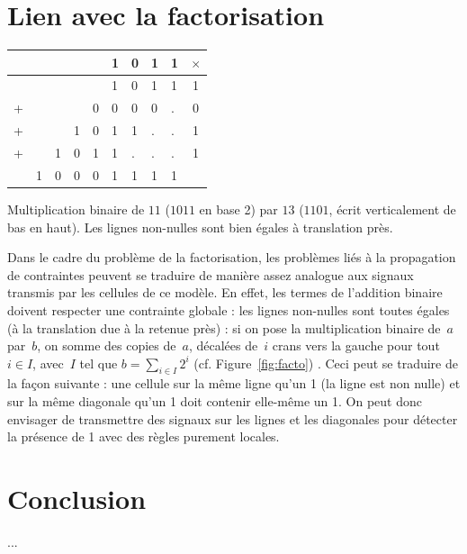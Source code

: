 \documentclass[11pt, openany, a4paper]{article}
\begin{document}

\section{Lien avec la factorisation}

\begin{floatingfigure}[r]{.5\textwidth}
\centering
\begin{tabular}{lllllllll|c}
&&&&&1&0&1&1&$\times$\\
\hline
&&&&&1&0&1&1&1\\
+&&&&0&0&0&0&.&0 \\
+&&&1&0&1&1&.&.&1\\
+&&1&0&1&1&.&.&.&1\\
\hline
&1&0&0&0&1&1&1&1&\\
\end{tabular}
\caption{Multiplication binaire de $11$ ($1011$ en base 2) par $13$ ($1101$, écrit verticalement de bas en haut). Les lignes non-nulles sont bien égales à translation près.}
\label{fig:facto}
\end{floatingfigure}
Dans le cadre du problème de la factorisation, les problèmes liés à la propagation de con\-train\-tes peuvent se traduire de manière assez analogue aux signaux transmis par les cellules de ce modèle. En effet, les termes de l'addition binaire doivent respecter une contrainte globale : les lignes non-nulles sont toutes égales (à la translation due à la retenue près) : si on pose la multiplication binaire de~$a$ par~$b$, on somme des copies de~$a$, décalées de~$i$ crans vers la gauche pour tout $i\in I$, avec~$I$ tel que $b = \sum_{i\in I}2^i$ (cf. Figure~\ref{fig:facto}) . Ceci peut se traduire de la façon suivante : une cellule sur la même ligne qu'un 1 (la ligne est non nulle) et sur la même diagonale qu'un 1 doit contenir elle-même un 1. On peut donc envisager de transmettre des signaux sur les lignes et les diagonales pour détecter la présence de 1 avec des règles purement locales.
\\

\section*{Conclusion}

...



\end{document}
